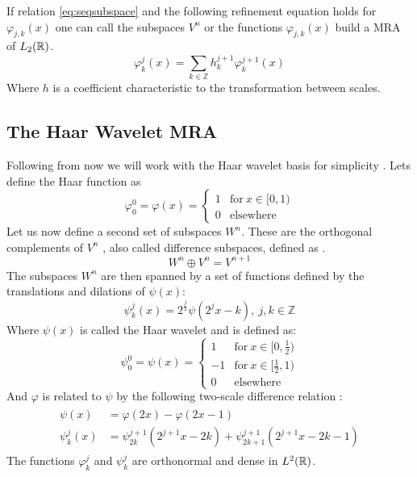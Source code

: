 \documentclass[../master_thesis.tex]{subfiles}
\begin{document}
If relation \ref{eq:seqsubspace} and the following refinement equation holds for $\varphi_{j,k}(x)$
one can call the subspaces $V^n$ or the functions $\varphi_{j,k}(x)$ build a \ac{MRA} of $L_2(\mathbb{R})$.
\begin{equation}
\varphi^j_k(x) = \sum_{k\in\mathbb{Z}} h^{j+1}_k\varphi^{j+1}_k(x)
\end{equation}
Where $h$ is a coefficient characteristic to the transformation between scales.
\subsection{The Haar Wavelet \ac{MRA}}
Following from now we will work with the Haar wavelet basis for simplicity \cite{Beylkin:MRA}.
Lets define the Haar function \cite{Schneider:2007} as
\begin{equation}
  \varphi^0_0 = \varphi(x) =
  \begin{cases}
  1 & \text{for} \ x\in [0,1)\\
  0 & \text{elsewhere}
\end{cases}
\end{equation}
Let us now define a second set of subspaces $W^n$. These are the orthogonal complements of $V^n$ \cite{Alpert1993}, also called difference subspaces,
defined as \cite{Beylkin:MRA, Sorland, Alpert1993}.
\begin{equation}
  W^n \oplus V^n = V^{n + 1} \label{eq:diffsubspace}
\end{equation}
The subspaces $W^n$ are then spanned by a set of functions defined by the translations and
dilations of $\psi(x)$:
\begin{equation}
  \psi_k^j(x) = 2^{\frac{j}{2}}\psi(2^jx - k),\  j,k \in \mathbb{Z} \label{eq:haarwavelet}
\end{equation}
Where $\psi(x)$ is called the Haar wavelet \cite{Schneider:2007} and is defined as:
\begin{equation}
  \psi^0_0 = \psi(x) =
  \begin{cases}
  1 & \text{for} \ x\in [0,\frac{1}{2})\\
  -1 & \text{for}\ x\in [\frac{1}{2}, 1)\\
  0 & \text{elsewhere}
\end{cases}
\end{equation}
And $ \varphi$ is related to $\psi$ by the following two-scale difference relation \cite{Beylkin:MRA, Schneider:2007, Sorland}:
\begin{align}
  \begin{split}\label{eq:2scalewavelet}
    \psi(x) &= \varphi(2x) - \varphi(2x - 1)\\
    \psi^j_k(x) &= \psi^{j+1}_{2k}(2^{j+1}x - 2k) + \psi^{j+1}_{2k+1}(2^{j+1}x - 2k - 1)
  \end{split}
\end{align}
The functions $\varphi^j_k$ and $\psi^j_k$ are orthonormal
and dense \cite{Beylkin:MRA, Sorland, SRJensen:2014} in $L^2(\mathbb{R})$.
\end{document}
